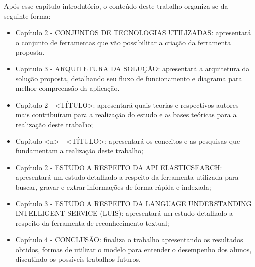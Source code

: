 Após esse capítulo introdutório, o conteúdo deste trabalho organiza-se da seguinte forma:
	\begin{itemize}
		\item{Capítulo 2 - \uppercase{Conjuntos de tecnologias utilizadas}: apresentará o conjunto de ferramentas que vão possibilitar a criação da ferramenta proposta.}
		\item{Capítulo 3 - \uppercase{Arquitetura da solução}: apresentará a arquitetura da solução proposta, detalhando seu fluxo de funcionamento e diagrama para melhor compreensão da aplicação.}
		\item{Capítulo 2 - \uppercase{<Título>}: apresentará quais teorias e respectivos autores mais contribuíram para a realização do estudo e as bases teóricas para a realização deste trabalho;}
		\item{Capítulo <n> - \uppercase{<Título>}: apresentará os conceitos e as pesquisas que fundamentam a realização deste trabalho;}
		\item{Capítulo 2 - \uppercase{Estudo a respeito da API Elasticsearch}: apresentará um estudo detalhado a respeito da ferramenta utilizada para buscar, gravar e extrar informações de forma rápida e indexada;}
		\item{Capítulo 3 - \uppercase{Estudo a respeito da Language Understanding Intelligent Service (LUIS)}: apresentará um estudo detalhado a respeito da ferramenta de reconhecimento textual;}
		\item{Capítulo 4 - CONCLUSÃO: finaliza o trabalho apresentando os resultados obtidos, formas de utilizar o modelo para entender o desempenho dos alunos, discutindo os possíveis trabalhos futuros.}
	\end{itemize}
